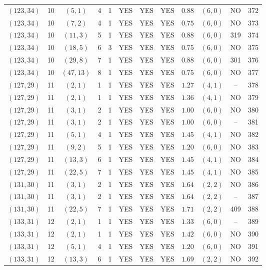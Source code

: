 \begin{longtable}{|c|c|c|c|c|c|c|c|c|c|c|c|}
$(123,34)$ & 10 & $(5,1)$ & 4 & 1 & YES & YES & YES & $0.88$ & $(6,0)$ & NO & 372\\
$(123,34)$ & 10 & $(7,2)$ & 4 & 1 & YES & YES & YES & $0.75$ & $(6,0)$ & NO & 373\\
$(123,34)$ & 10 & $(11,3)$ & 5 & 1 & YES & YES & YES & $0.88$ & $(6,0)$ & 319 & 374\\
$(123,34)$ & 10 & $(18,5)$ & 6 & 3 & YES & YES & YES & $0.75$ & $(6,0)$ & NO & 375\\
$(123,34)$ & 10 & $(29,8)$ & 7 & 1 & YES & YES & YES & $0.88$ & $(6,0)$ & 301 & 376\\
$(123,34)$ & 10 & $(47,13)$ & 8 & 1 & YES & YES & YES & $0.75$ & $(6,0)$ & NO & 377\\
$(127,29)$ & 11 & $(2,1)$ & 1 & 1 & YES & YES & YES & $1.27$ & $(4,1)$ & -- & 378\\
$(127,29)$ & 11 & $(2,1)$ & 1 & 1 & YES & YES & YES & $1.36$ & $(4,1)$ & NO & 379\\
$(127,29)$ & 11 & $(3,1)$ & 2 & 1 & YES & YES & YES & $1.00$ & $(6,0)$ & NO & 380\\
$(127,29)$ & 11 & $(3,1)$ & 2 & 1 & YES & YES & YES & $1.00$ & $(6,0)$ & -- & 381\\
$(127,29)$ & 11 & $(5,1)$ & 4 & 1 & YES & YES & YES & $1.45$ & $(4,1)$ & NO & 382\\
$(127,29)$ & 11 & $(9,2)$ & 5 & 1 & YES & YES & YES & $1.20$ & $(6,0)$ & NO & 383\\
$(127,29)$ & 11 & $(13,3)$ & 6 & 1 & YES & YES & YES & $1.45$ & $(4,1)$ & NO & 384\\
$(127,29)$ & 11 & $(22,5)$ & 7 & 1 & YES & YES & YES & $1.45$ & $(4,1)$ & NO & 385\\
$(131,30)$ & 11 & $(3,1)$ & 2 & 1 & YES & YES & YES & $1.64$ & $(2,2)$ & NO & 386\\
$(131,30)$ & 11 & $(3,1)$ & 2 & 1 & YES & YES & YES & $1.64$ & $(2,2)$ & -- & 387\\
$(131,30)$ & 11 & $(22,5)$ & 7 & 1 & YES & YES & YES & $1.71$ & $(2,2)$ & 409 & 388\\
$(133,31)$ & 12 & $(2,1)$ & 1 & 1 & YES & YES & YES & $1.33$ & $(6,0)$ & -- & 389\\
$(133,31)$ & 12 & $(2,1)$ & 1 & 1 & YES & YES & YES & $1.42$ & $(6,0)$ & NO & 390\\
$(133,31)$ & 12 & $(5,1)$ & 4 & 1 & YES & YES & YES & $1.20$ & $(6,0)$ & NO & 391\\
$(133,31)$ & 12 & $(13,3)$ & 6 & 1 & YES & YES & YES & $1.69$ & $(2,2)$ & NO & 392\\

\end{longtable}
